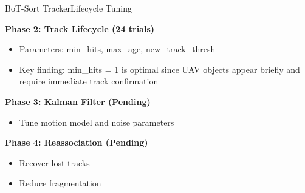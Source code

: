 \documentclass[10pt]{beamer}
\begin{document}
\begin{frame}{BoT-Sort Tracker}{Lifecycle Tuning}
	
	\textbf{Phase 2: Track Lifecycle (24 trials)}
	\begin{itemize}
		\item Parameters: min\_hits, max\_age, new\_track\_thresh
		\item Key finding: min\_hits = 1 is optimal since UAV objects appear briefly and require immediate track confirmation
	\end{itemize}
	
	\textbf{Phase 3: Kalman Filter (Pending)}
	\begin{itemize}
		\item Tune motion model and noise parameters
	\end{itemize}
	
	\textbf{Phase 4: Reassociation (Pending)}
	\begin{itemize}
		\item Recover lost tracks
		\item Reduce fragmentation
	\end{itemize}
	
\end{frame}
\end{document}
